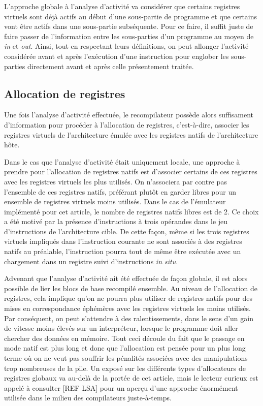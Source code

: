 \documentclass{article} %
\begin{document}
L'approche globale à l'analyse d'activité va considérer que certains registres virtuels sont déjà actifs au début d'une sous-partie de programme et que certains vont être actifs dans une sous-partie subséquente. Pour ce faire, il suffit juste de faire passer de l'information entre les sous-parties d'un programme au moyen de \textit{in} et \textit{out}. Ainsi, tout en respectant leurs définitions, on peut allonger l'activité considérée avant et après l'exécution d'une instruction pour englober les sous-parties directement avant et après celle présentement traitée.

\subsection{Allocation de registres}
Une fois l'analyse d'activité effectuée, le recompilateur possède alors suffisament d'information pour procéder à l'allocation de registres, c'est-à-dire, associer les registres virtuels de l'architecture émulée avec les registres natifs de l'architecture hôte.

Dans le cas que l'analyse d'activité était uniquement locale, une approche à prendre pour l'allocation de registres natifs est d'associer certains de ces registres avec les registres virtuels les plus utilisés. On n'associera par contre pas l'ensemble de ces registres natifs, préférant plutôt en garder libres pour un ensemble de registres virtuels moins utilisés. Dans le cas de l'émulateur implémenté pour cet article, le nombre de registres natifs libres est de 2. Ce choix a été motivé par la présence d'instructions à trois opérandes dans le jeu d'instructions de l'architecture cible. De cette façon, même si les trois registres virtuels impliqués dans l'instruction courante ne sont associés à des registres natifs au préalable, l'instruction pourra tout de même être exécutée avec un chargement dans un registre suivi d'instructions \textit{in situ}.

Advenant que l'analyse d'activité ait été effectuée de façon globale, il est alors possible de lier les blocs de base recompilé ensemble. Au niveau de l'allocation de registres, cela implique qu'on ne pourra plus utiliser de registres natifs pour des mises en correspondance éphémères avec les registres virtuels les moins utilisés. Par conséquent, on peut s'attendre à des ralentissements, dans le sens d'un gain de vitesse moins élevés sur un interpréteur, lorsque le programme doit aller chercher des données en mémoire. Tout ceci découle du fait que le passage en mode natif est plus long et donc que l'allocation est pensée pour un plus long terme où on ne veut pas souffrir les pénalités associées avec des manipulations trop nombreuses de la pile. Un exposé sur les différents types d'allocateurs de registres globaux va au-delà de la portée de cet article, mais le lecteur curieux est appelé à consulter [REF LSA] pour un aperçu d'une approche énormément utilisée dans le milieu des compilateurs juste-à-temps.
\end{document}
